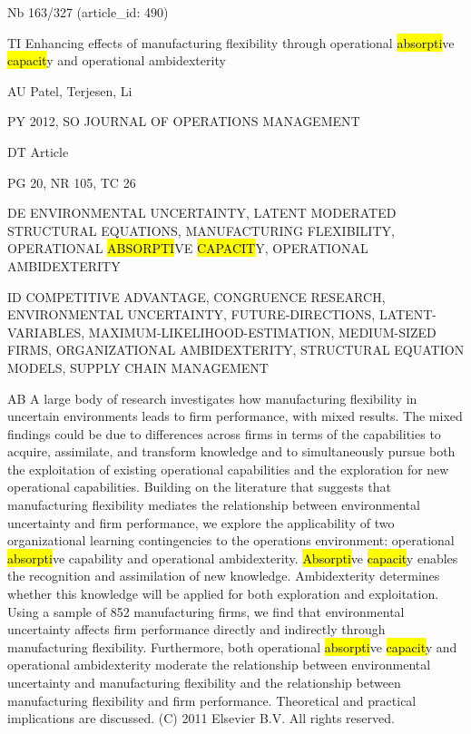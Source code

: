 \documentclass[a4paper]{article}
\begin{document}
\vspace*{-2cm}
Nb \tabto{0cm}163/327 (article\_id: 490)\par
TI \tabto{0cm}Enhancing effects of manufacturing flexibility through operational \hl{absorpti}ve \hl{capacit}y and operational ambidexterity\par
AU \tabto{0cm}Patel, Terjesen, Li\par
PY \tabto{0cm}2012, SO JOURNAL OF OPERATIONS MANAGEMENT\par
DT \tabto{0cm}Article\par
PG \tabto{0cm}20, NR 105, TC 26\par
DE \tabto{0cm}ENVIRONMENTAL UNCERTAINTY, LATENT MODERATED STRUCTURAL EQUATIONS, MANUFACTURING FLEXIBILITY, OPERATIONAL \hl{ABSORPTI}VE \hl{CAPACIT}Y, OPERATIONAL AMBIDEXTERITY\par
ID \tabto{0cm}COMPETITIVE ADVANTAGE, CONGRUENCE RESEARCH, ENVIRONMENTAL UNCERTAINTY, FUTURE-DIRECTIONS, LATENT-VARIABLES, MAXIMUM-LIKELIHOOD-ESTIMATION, MEDIUM-SIZED FIRMS, ORGANIZATIONAL AMBIDEXTERITY, STRUCTURAL EQUATION MODELS, SUPPLY CHAIN MANAGEMENT\par
AB \tabto{0cm}A large body of research investigates how manufacturing flexibility in uncertain environments leads to firm performance, with mixed results. The mixed findings could be due to differences across firms in terms of the capabilities to acquire, assimilate, and transform knowledge and to simultaneously pursue both the exploitation of existing operational capabilities and the exploration for new operational capabilities. Building on the literature that suggests that manufacturing flexibility mediates the relationship between environmental uncertainty and firm performance, we explore the applicability of two organizational learning contingencies to the operations environment: operational \hl{absorpti}ve capability and operational ambidexterity. \hl{Absorpti}ve \hl{capacit}y enables the recognition and assimilation of new knowledge. Ambidexterity determines whether this knowledge will be applied for both exploration and exploitation. Using a sample of 852 manufacturing firms, we find that environmental uncertainty affects firm performance directly and indirectly through manufacturing flexibility. Furthermore, both operational \hl{absorpti}ve \hl{capacit}y and operational ambidexterity moderate the relationship between environmental uncertainty and manufacturing flexibility and the relationship between manufacturing flexibility and firm performance. Theoretical and practical implications are discussed. (C) 2011 Elsevier B.V. All rights reserved.\par
\clearpage
\end{document}
